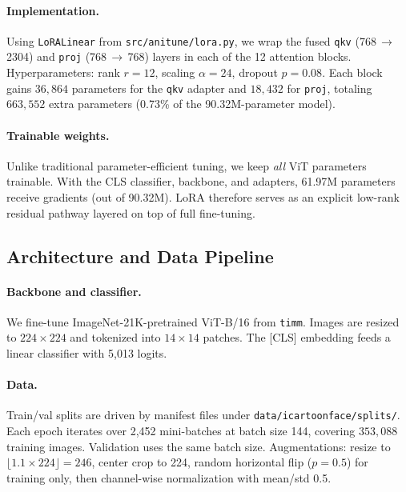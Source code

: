 \documentclass[11pt]{article}
\begin{document}
\paragraph{Implementation.} Using \texttt{LoRALinear} from \texttt{src/anitune/lora.py}, we wrap the fused \texttt{qkv} (768\,$\rightarrow$\,2304) and \texttt{proj} (768\,$\rightarrow$\,768) layers in each of the 12 attention blocks. Hyperparameters: rank $r=12$, scaling $\alpha=24$, dropout $p=0.08$. Each block gains $36{,}864$ parameters for the \texttt{qkv} adapter and $18{,}432$ for \texttt{proj}, totaling $663{,}552$ extra parameters (0.73\% of the 90.32M-parameter model).

\paragraph{Trainable weights.} Unlike traditional parameter-efficient tuning, we keep \emph{all} ViT parameters trainable. With the CLS classifier, backbone, and adapters, 61.97M parameters receive gradients (out of 90.32M). LoRA therefore serves as an explicit low-rank residual pathway layered on top of full fine-tuning.

\subsection{Architecture and Data Pipeline}

\paragraph{Backbone and classifier.} We fine-tune ImageNet-21K-pretrained ViT-B/16 from \texttt{timm}. Images are resized to $224 \times 224$ and tokenized into $14 \times 14$ patches. The [CLS] embedding feeds a linear classifier with 5,013 logits.

\paragraph{Data.} Train/val splits are driven by manifest files under \texttt{data/icartoonface/splits/}. Each epoch iterates over 2,452 mini-batches at batch size 144, covering $353{,}088$ training images. Validation uses the same batch size. Augmentations: resize to $\lfloor1.1\times224\rfloor=246$, center crop to 224, random horizontal flip ($p=0.5$) for training only, then channel-wise normalization with mean/std 0.5.
\end{document}
